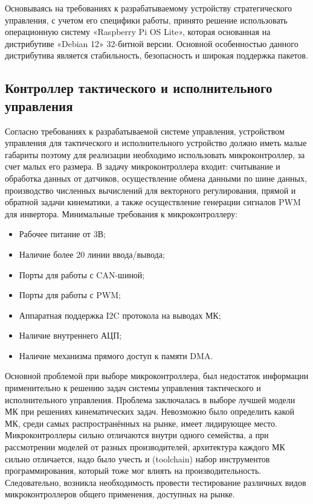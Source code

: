 Основываясь на требованиях к разрабатываемому устройству стратегического управления, с учетом его специфики работы, принято решение использовать операционную систему «Raspberry Pi OS Lite», которая основанная на дистрибутиве «Debian 12» 32-битной версии. Основной особенностью данного дистрибутива является стабильность, безопасность и широкая поддержка пакетов.

\subsection{Контроллер тактического и исполнительного управления}

Согласно требованиях к разрабатываемой системе управления, устройством управления для тактического и исполнительного устройство должно иметь малые габариты поэтому для реализации необходимо использовать микроконтроллер, за счет малых его размера. В задачу микроконтроллера входит: считывание и обработка данных от датчиков, осуществление обмена данными по шине данных, производство численных вычислений для векторного регулирования, прямой и обратной задачи кинематики, а также осуществление генерации сигналов PWM для инвертора. Минимальные требования к микроконтроллеру:
\begin{itemize}
	\item Рабочее питание от 3В;
	\item Наличие более 20 линии ввода/вывода;
	\item Порты для работы с CAN-шиной;
	\item Порты для работы с PWM;
	\item Аппаратная поддержка I2C протокола на выводах МК;
	\item Наличие внутреннего АЦП;
	\item Наличие механизма прямого доступ к памяти DMA.
\end{itemize}

Основной проблемой при выборе микроконтроллера, был недостаток информации применительно к решению задач системы управления тактического и исполнительного управления. Проблема заключалась в выборе лучшей модели МК при решениях кинематических задач. Невозможно было определить какой МК, среди самых распространённых на рынке, имеет лидирующее место. Микроконтроллеры сильно отличаются внутри одного семейства, а при рассмотрении моделей от разных производителей, архитектура каждого МК сильно отличается, надо было учесть и (toolchain) набор инструментов программирования, который тоже мог влиять на производительность. Следовательно, возникла необходимость провести тестирование различных видов микроконтроллеров общего применения, доступных на рынке.


